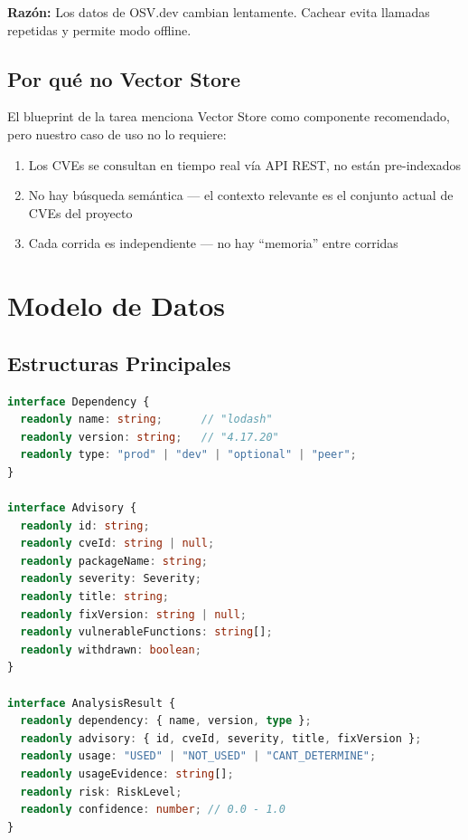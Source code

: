 \documentclass[11pt,a4paper]{article}
\begin{document}
\textbf{Razón:} Los datos de OSV.dev cambian lentamente. Cachear evita llamadas repetidas y permite modo offline.

\subsection{Por qué no Vector Store}

El blueprint de la tarea menciona Vector Store como componente recomendado, pero nuestro caso de uso no lo requiere:

\begin{enumerate}
  \item Los CVEs se consultan en tiempo real vía API REST, no están pre-indexados
  \item No hay búsqueda semántica — el contexto relevante es el conjunto actual de CVEs del proyecto
  \item Cada corrida es independiente — no hay ``memoria'' entre corridas
\end{enumerate}

\section{Modelo de Datos}

\subsection{Estructuras Principales}

\begin{lstlisting}[language=TypeScript]
interface Dependency {
  readonly name: string;      // "lodash"
  readonly version: string;   // "4.17.20"
  readonly type: "prod" | "dev" | "optional" | "peer";
}

interface Advisory {
  readonly id: string;
  readonly cveId: string | null;
  readonly packageName: string;
  readonly severity: Severity;
  readonly title: string;
  readonly fixVersion: string | null;
  readonly vulnerableFunctions: string[];
  readonly withdrawn: boolean;
}

interface AnalysisResult {
  readonly dependency: { name, version, type };
  readonly advisory: { id, cveId, severity, title, fixVersion };
  readonly usage: "USED" | "NOT_USED" | "CANT_DETERMINE";
  readonly usageEvidence: string[];
  readonly risk: RiskLevel;
  readonly confidence: number; // 0.0 - 1.0
}
\end{lstlisting}
\end{document}
